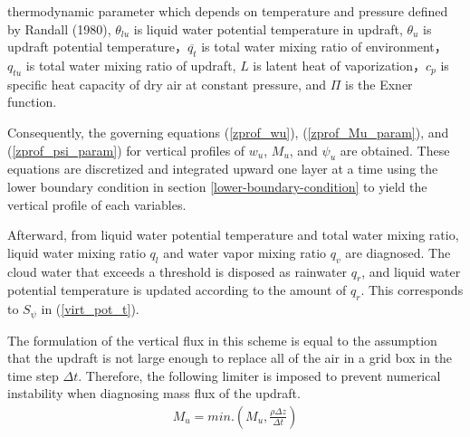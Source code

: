 thermodynamic parameter which depends on temperature and pressure defined by Randall (1980), \(\theta_{lu}\) is liquid water potential temperature in updraft, \(\theta_u\) is updraft potential
temperature，\(\overline{q_t}\) is total water mixing ratio of environment， \(q_{tu}\) is total water mixing ratio of updraft, \(L\) is latent heat of vaporization，\(c_p\) is specific heat capacity
of dry air at constant pressure, and \(\Pi\) is the Exner function.

Consequently, the governing equations (\ref{zprof_wu}{}), (\ref{zprof_Mu_param}{}), and (\ref{zprof_psi_param}) for vertical profiles of \(w_u\), \(M_u\),
and \(\psi_u\) are obtained. These equations are discretized and integrated upward one layer at a time using the lower boundary condition in section \ref{lower-boundary-condition} to
yield the vertical profile of each variables.

Afterward, from liquid water potential temperature and total water mixing ratio, liquid water mixing ratio \(q_l\) and water vapor mixing ratio \(q_v\) are diagnosed. The cloud water that exceeds a
threshold is disposed as rainwater \(q_r\), and liquid water potential temperature is updated according to the amount of \(q_r\). This corresponds to \(S_\psi\) in (\ref{virt_pot_t}).

The formulation of the vertical flux in this scheme is equal to the assumption that the updraft is not large enough to replace all of the air in a grid box in the time step \(\Delta t\). Therefore,
the following limiter is imposed to prevent numerical instability when diagnosing mass flux of the updraft. \begin{eqnarray}\label{Mu_limit}
    M_u = min.\left(M_u, \frac{\rho\Delta z}{\Delta t}\right)\end{eqnarray}
